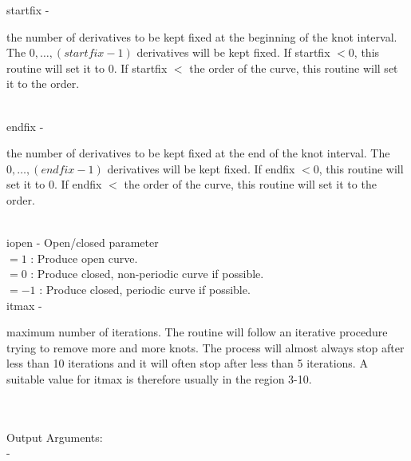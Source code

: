         \>\>    {\fov startfix}\> - \>  \begin{minipg2}
                     the number of derivatives to be kept fixed at
			 the beginning of the knot interval.
                     The $0,\ldots,(startfix-1)$ derivatives will be kept fixed.
                        If startfix $<0$, this routine will set it to 0.
                        If startfix $<$ the order of the curve, this routine
                        will set it to the order.
                               \end{minipg2}\\[0.8ex]
        \>\>    {\fov endfix}\> - \>  \begin{minipg2}
                     the number of derivatives to be kept fixed at
		         the end of the knot interval.
                     The $0,\ldots,(endfix-1)$ derivatives will be kept fixed.
                        If endfix $<0$, this routine will set it to 0.
                        If endfix $<$ the order of the curve, this routine
                        will set it to the order.
                               \end{minipg2}\\[0.8ex]
        \>\>    {\fov iopen}\> - \>  Open/closed parameter\\
            \>\>\>\>  $= 1$  : Produce open curve.\\
            \>\>\>\>  $= 0$ : Produce closed, non-periodic curve if possible.\\
            \>\>\>\>  $= -1$ : Produce closed, periodic curve if possible.\\
        \>\>    {\fov itmax}\> - \>  \begin{minipg2}
                     maximum number of iterations. The routine will
                        follow an iterative procedure trying to remove
                        more and more knots. The process will almost always
                        stop after less than 10 iterations and it will often
                        stop after less than 5 iterations. A suitable
                        value for itmax is therefore usually in the region
                        3-10.
                               \end{minipg2}\\
\\
	\>Output Arguments:\\
        \>\>    {\fov }\> - \>  \begin{minipg2}
        
                               \end{minipg2}\\
